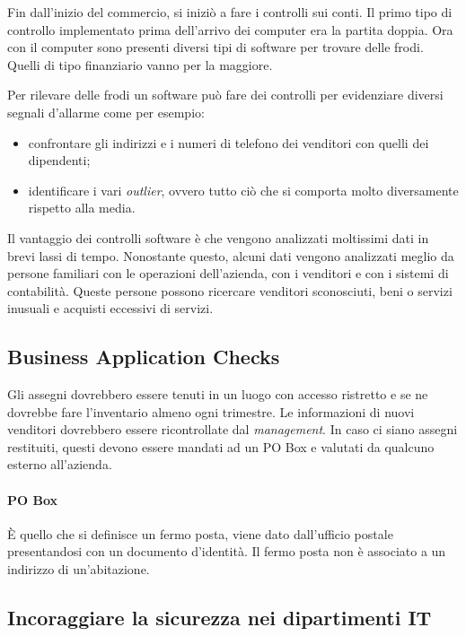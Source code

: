 Fin dall'inizio del commercio, si iniziò a fare i controlli sui conti. Il
primo tipo di controllo implementato prima dell'arrivo dei computer era la
partita doppia. Ora con il computer sono presenti diversi tipi di software
per trovare delle frodi. Quelli di tipo finanziario vanno per la maggiore.



Per rilevare delle frodi un software può fare dei controlli
per evidenziare diversi segnali d'allarme come per esempio:
\begin{itemize}
\item confrontare gli indirizzi e i numeri di telefono dei venditori con
quelli dei dipendenti;
\item identificare i vari \textit{outlier}, ovvero tutto ciò che si
comporta molto diversamente rispetto alla media.
\end{itemize}
Il vantaggio dei controlli software è che vengono analizzati moltissimi
dati in brevi lassi di tempo. Nonostante questo, alcuni dati vengono
analizzati meglio da persone familiari con le operazioni dell'azienda,
con i venditori e con i sistemi di contabilità.
Queste persone possono ricercare venditori sconosciuti, beni o servizi
inusuali e acquisti eccessivi di servizi.

\subsection{Business Application Checks}
Gli assegni dovrebbero essere tenuti in un luogo con accesso ristretto e
se ne dovrebbe fare l'inventario almeno ogni trimestre.
Le informazioni di nuovi venditori dovrebbero essere ricontrollate
dal \textit{management}. In caso ci siano assegni restituiti,
questi devono essere mandati ad un PO Box e valutati da qualcuno esterno
all'azienda.

\paragraph*{PO Box}

È quello che si definisce un fermo posta, viene dato dall'ufficio postale
presentandosi con un documento d'identità. Il fermo posta non è associato a un
indirizzo di un'abitazione.

\subsection{Incoraggiare la sicurezza nei dipartimenti IT}

